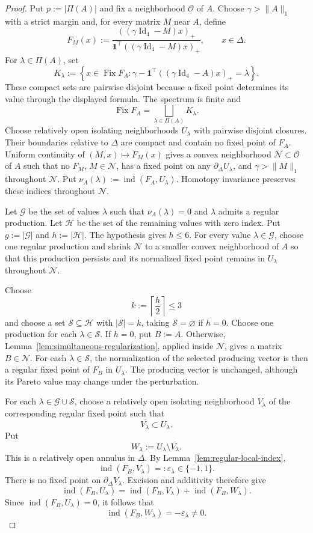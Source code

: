 \documentclass[11pt,a4paper]{article}
\theoremstyle{definition}
\newcommand{\Id}{\operatorname{Id}}
\newcommand{\one}{\mathbf 1}
\newcommand{\Fix}{\operatorname{Fix}}
\newcommand{\ind}{\operatorname{ind}}
\begin{document}
\smallskip
\begin{proof}
Put $p:=|\Pi(A)|$ and fix a neighborhood $\mathcal O$ of $A$.
Choose $\gamma>\|A\|_1$ with a strict margin and, for every matrix $M$
near $A$, define
$$
F_M(x):=
\frac{((\gamma\Id_4-M)x)_+}
{\one^\top((\gamma\Id_4-M)x)_+},
\qquad x\in\Delta.
$$
For $\lambda\in\Pi(A)$, set
$$
K_\lambda
:=
\left\{
x\in\Fix F_A:
\gamma-\one^\top((\gamma\Id_4-A)x)_+=\lambda
\right\}.
$$
These compact sets are pairwise disjoint because a fixed point
determines its value through the displayed formula.
The spectrum is finite and
$$
\Fix F_A=\bigsqcup_{\lambda\in\Pi(A)}K_\lambda.
$$
Choose relatively open isolating neighborhoods $U_\lambda$ with
pairwise disjoint closures. Their boundaries relative to $\Delta$ are
compact and contain no fixed point of $F_A$. Uniform continuity of
$(M,x)\mapsto F_M(x)$ gives
a convex neighborhood
$\mathcal N\subset\mathcal O$ of $A$ such that no $F_M$,
$M\in\mathcal N$, has a fixed point on any
$\partial_\Delta U_\lambda$, and
$\gamma>\|M\|_1$ throughout $\mathcal N$.
Put $\nu_A(\lambda):=\ind(F_A,U_\lambda)$. Homotopy invariance
preserves these indices throughout $\mathcal N$.

Let $\mathcal G$ be the set of values $\lambda$ such that
$\nu_A(\lambda)=0$ and $\lambda$ admits a regular production. Let
$\mathcal H$ be the set of the remaining values with zero index. Put
$g:=|\mathcal G|$ and $h:=|\mathcal H|$. The hypothesis gives
$h\leq6$. For every value $\lambda\in\mathcal G$, choose one regular
production and shrink $\mathcal N$ to a smaller convex neighborhood of
$A$ so that this production persists and its normalized fixed point
remains in $U_\lambda$ throughout $\mathcal N$.

Choose
$$
k:=\left\lceil\frac h2\right\rceil\leq3
$$
and choose a set $\mathcal S\subseteq\mathcal H$ with
$|\mathcal S|=k$, taking $\mathcal S=\varnothing$ if $h=0$. Choose one
production for each $\lambda\in\mathcal S$. If $h=0$, put $B:=A$.
Otherwise, Lemma~\ref{lem:simultaneous-regularization}, applied inside
$\mathcal N$, gives a matrix $B\in\mathcal N$. For each
$\lambda\in\mathcal S$, the normalization of the selected producing
vector is then a regular fixed point of $F_B$ in $U_\lambda$. The
producing vector is unchanged, although its Pareto value may change
under the perturbation.

For each $\lambda\in\mathcal G\cup\mathcal S$, choose a relatively open
isolating neighborhood
$V_\lambda$ of the corresponding regular fixed point such that
$$
\overline{V_\lambda}\subset U_\lambda.
$$
Put
$$
W_\lambda
:=
U_\lambda\setminus\overline{V_\lambda}.
$$
This is a relatively open annulus in $\Delta$. By
Lemma~\ref{lem:regular-local-index},
$$
\ind(F_B,V_\lambda)
=:
\varepsilon_\lambda
\in\{-1,1\}.
$$
There is no fixed point on $\partial_\Delta V_\lambda$. Excision and
additivity therefore give
$$
\ind(F_B,U_\lambda)
=
\ind(F_B,V_\lambda)+\ind(F_B,W_\lambda).
$$
Since $\ind(F_B,U_\lambda)=0$, it follows that
$$
\ind(F_B,W_\lambda)
=
-\varepsilon_\lambda
\neq0.
$$


\end{proof}
\end{document}
